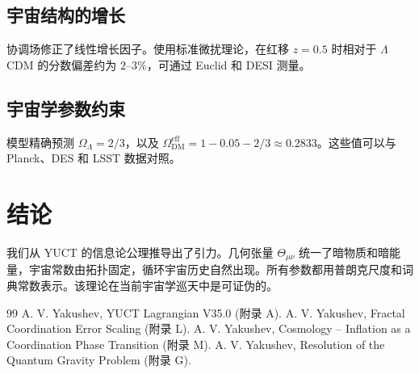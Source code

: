 \documentclass[12pt,a4paper]{article}
\begin{document}
	\subsection{宇宙结构的增长}
	协调场修正了线性增长因子。使用标准微扰理论，在红移 \(z=0.5\) 时相对于 \(\Lambda\)CDM 的分数偏差约为 \(2\)–\(3\%\)，可通过 Euclid 和 DESI 测量。
	
	\subsection{宇宙学参数约束}
	模型精确预测 \(\Omega_\Lambda = 2/3\)，以及 \(\Omega_{\mathrm{DM}}^{\mathrm{eff}} = 1 - 0.05 - 2/3 \approx 0.2833\)。这些值可以与 Planck、DES 和 LSST 数据对照。
	
	\section{结论}
	我们从 YUCT 的信息论公理推导出了引力。几何张量 \(\Theta_{\mu\nu}\) 统一了暗物质和暗能量，宇宙常数由拓扑固定，循环宇宙历史自然出现。所有参数都用普朗克尺度和词典常数表示。该理论在当前宇宙学巡天中是可证伪的。
	
	\begin{thebibliography}{99}
		 A. V. Yakushev, YUCT Lagrangian V35.0 (附录 A).
		 A. V. Yakushev, Fractal Coordination Error Scaling (附录 L).
		 A. V. Yakushev, Cosmology -- Inflation as a Coordination Phase Transition (附录 M).
		 A. V. Yakushev, Resolution of the Quantum Gravity Problem (附录 G).
	\end{thebibliography}
	
\end{document}
